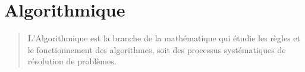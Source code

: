 \part{Algorithmique}

\vspace{5em}

\begin{quote}
    L'Algorithmique est la branche de la mathématique qui étudie les règles et le fonctionnement des algorithmes, soit des processus systématiques de résolution de problèmes.
\end{quote}

\clearpage